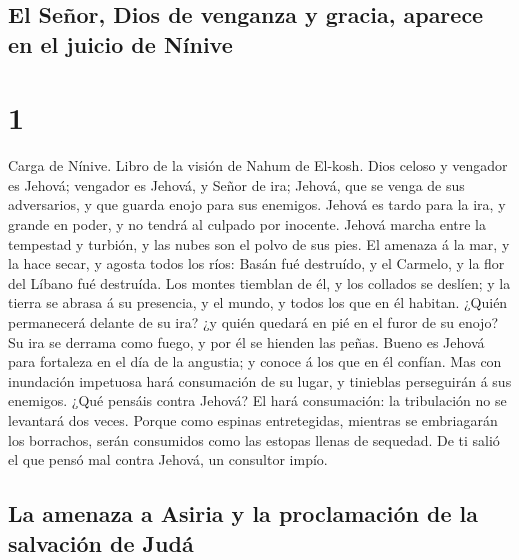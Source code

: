 \hypertarget{el-seuxf1or-dios-de-venganza-y-gracia-aparece-en-el-juicio-de-nuxednive}{%
\subsection{El Señor, Dios de venganza y gracia, aparece en el juicio de
Nínive}\label{el-seuxf1or-dios-de-venganza-y-gracia-aparece-en-el-juicio-de-nuxednive}}

\hypertarget{section-34-1}{%
\section{1}\label{section-34-1}}

 Carga de Nínive. Libro de la visión de Nahum de El-kosh.
 Dios celoso y vengador es Jehová; vengador es Jehová, y
Señor de ira; Jehová, que se venga de sus adversarios, y que guarda
enojo para sus enemigos.  Jehová es tardo para la ira, y
grande en poder, y no tendrá al culpado por inocente. Jehová marcha
entre la tempestad y turbión, y las nubes son el polvo de sus pies.
 El amenaza á la mar, y la hace secar, y agosta todos los
ríos: Basán fué destruído, y el Carmelo, y la flor del Líbano fué
destruída.  Los montes tiemblan de él, y los collados se
deslíen; y la tierra se abrasa á su presencia, y el mundo, y todos los
que en él habitan.  ¿Quién permanecerá delante de su ira?
¿y quién quedará en pié en el furor de su enojo? Su ira se derrama como
fuego, y por él se hienden las peñas.  Bueno es Jehová
para fortaleza en el día de la angustia; y conoce á los que en él
confían.  Mas con inundación impetuosa hará consumación de
su lugar, y tinieblas perseguirán á sus enemigos.  ¿Qué
pensáis contra Jehová? El hará consumación: la tribulación no se
levantará dos veces.  Porque como espinas entretegidas,
mientras se embriagarán los borrachos, serán consumidos como las estopas
llenas de sequedad.  De ti salió el que pensó mal contra
Jehová, un consultor impío.

\hypertarget{la-amenaza-a-asiria-y-la-proclamaciuxf3n-de-la-salvaciuxf3n-de-juduxe1}{%
\subsection{La amenaza a Asiria y la proclamación de la salvación de
Judá}\label{la-amenaza-a-asiria-y-la-proclamaciuxf3n-de-la-salvaciuxf3n-de-juduxe1}}


